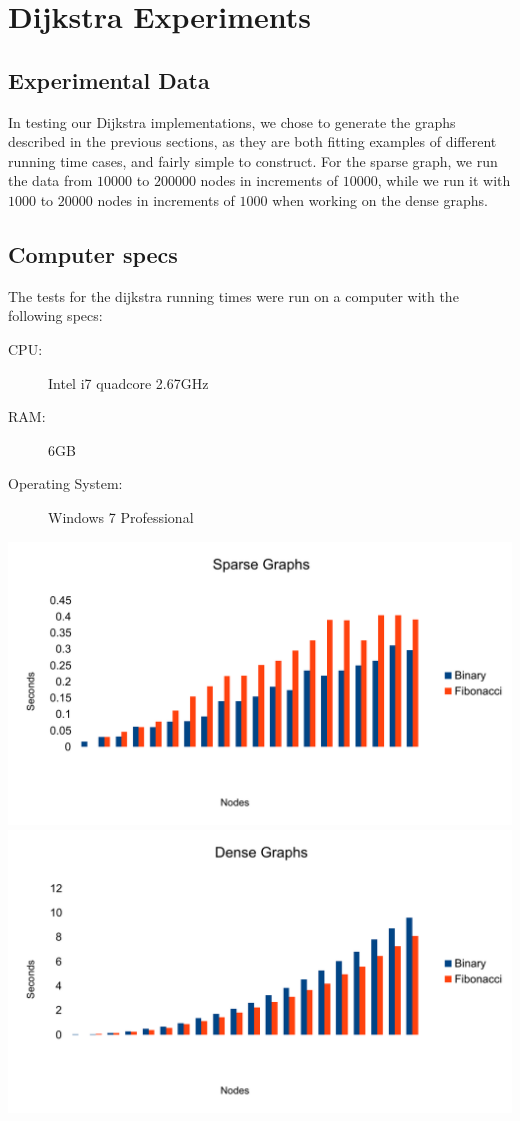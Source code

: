 \section{Dijkstra Experiments}

\subsection{Experimental Data}

In testing our Dijkstra implementations, we chose to generate the graphs described in the previous sections, as they are both fitting examples of different running time cases, and fairly simple to construct.
For the sparse graph, we run the data from $10000$ to $200000$ nodes in increments of $10000$, while we run it with $1000$ to $20000$ nodes in increments of $1000$ when working on the dense graphs.

\subsection{Computer specs}
The tests for the dijkstra running times were run on a computer with the following specs:

\begin{description}
\item[CPU:] Intel i7 quadcore 2.67GHz
\item[RAM:] 6GB
\item[Operating System:] Windows 7 Professional 
\end{description}


\includegraphics[width=\textwidth]{graphs/sparse}
\includegraphics[width=\textwidth]{graphs/dense}

